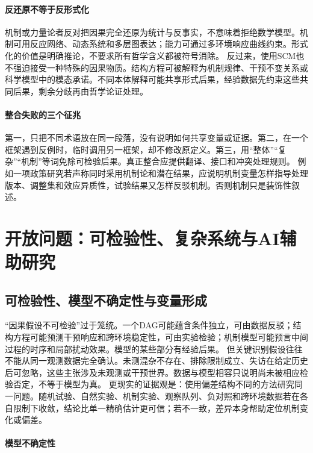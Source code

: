 \paragraph{反还原不等于反形式化}

机制或力量论者反对把因果完全还原为统计与反事实，不意味着拒绝数学模型。机制可用反应网络、动态系统和多层图表达；能力可通过多环境响应曲线约束。形式化的价值是明确推论，不要求所有哲学含义都被符号消除。
反过来，使用SCM也不强迫接受一种特殊的因果物质。结构方程可被解释为机制规律、干预不变关系或科学模型中的模态承诺。不同本体解释可能共享形式后果，经验数据先约束这些共同后果，剩余分歧再由哲学论证处理。

\paragraph{整合失败的三个征兆}

第一，只把不同术语放在同一段落，没有说明如何共享变量或证据。第二，在一个框架遇到反例时，临时调用另一框架，却不修改原定义。第三，用“整体”“复杂”“机制”等词免除可检验后果。真正整合应提供翻译、接口和冲突处理规则。
例如一项政策研究若声称同时采用机制论和潜在结果，应说明机制变量怎样指导处理版本、调整集和效应异质性，试验结果又怎样反驳机制。否则机制只是装饰性叙述。

\section{开放问题：可检验性、复杂系统与AI辅助研究}

\subsection{可检验性、模型不确定性与变量形成}

“因果假设不可检验”过于笼统。一个DAG可能蕴含条件独立，可由数据反驳；结构方程可能预测干预响应和跨环境稳定性，可由实验检验；机制模型可能预言中间过程的时序和局部扰动效果。模型的某些部分有经验后果。
但关键识别假设往往不能从同一观测数据完全确认。未测混杂不存在、排除限制成立、失访在给定历史后可忽略，这些主张涉及未观测或干预世界。数据与模型相容只说明尚未被相应检验否定，不等于模型为真。
更现实的证据观是：使用偏差结构不同的方法研究同一问题。随机试验、自然实验、机制实验、观察队列、负对照和跨环境数据若在各自限制下收敛，结论比单一精确估计更可信；若不一致，差异本身帮助定位机制变化或偏差。

\paragraph{模型不确定性}

